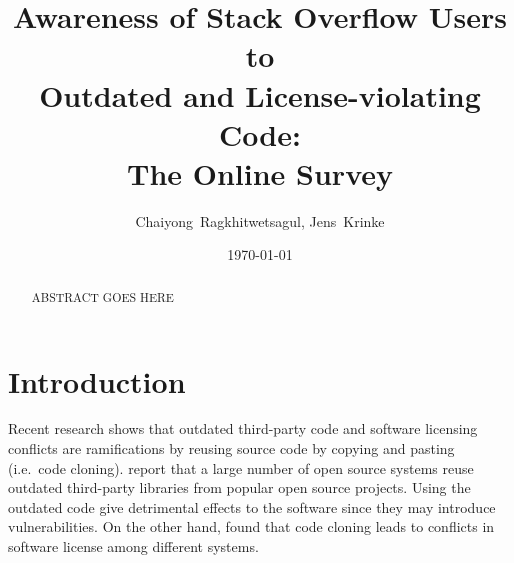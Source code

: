 \documentclass{svjour3}                     %
\begin{document}
\title{Awareness of Stack Overflow Users to\\ Outdated and License-violating Code:\\ The Online Survey}


\author{Chaiyong~Ragkhitwetsagul, Jens~Krinke}


\institute{Chaiyong Ragkhitwetsagul~(\Letter), Jens Krinke \at
              Computer Science Department., University College London, UK \\
              Tel.: +44 (0)20 7679,  Fax: +44 (0)20 7387 1397\\
              \email{\{ucabagk, j.krinke\}@ucl.ac.uk}           %
}

\date{\today}


\maketitle

\begin{abstract}
ABSTRACT GOES HERE
\end{abstract}

\section{Introduction}

Recent research shows that outdated third-party code and software
licensing conflicts are ramifications by reusing source code by copying and
pasting (i.e.~code cloning). \cite{Xia2014} report that a large number of open
source systems reuse outdated third-party libraries from popular open source
projects. Using the outdated code give detrimental effects to the software since
they may introduce vulnerabilities. On the other hand, \cite{German2009} found
that code cloning leads to conflicts in software license among different
systems.
\end{document}
